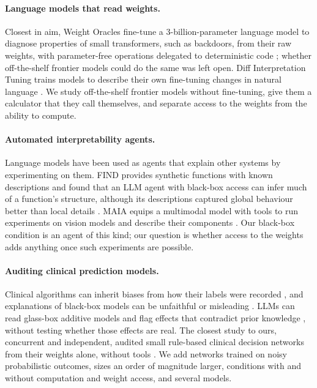 \documentclass[11pt]{article}
\begin{document}
\paragraph{Language models that read weights.} Closest in aim, Weight Oracles fine-tune a 3-billion-parameter language model to diagnose properties of small transformers, such as backdoors, from their raw weights, with parameter-free operations delegated to deterministic code \cite{kabra2026}; whether off-the-shelf frontier models could do the same was left open. Diff Interpretation Tuning trains models to describe their own fine-tuning changes in natural language \cite{goel2025}. We study off-the-shelf frontier models without fine-tuning, give them a calculator that they call themselves, and separate access to the weights from the ability to compute.

\paragraph{Automated interpretability agents.} Language models have been used as agents that explain other systems by experimenting on them. FIND provides synthetic functions with known descriptions and found that an LLM agent with black-box access can infer much of a function's structure, although its descriptions captured global behaviour better than local details \cite{schwettmann2023}. MAIA equips a multimodal model with tools to run experiments on vision models and describe their components \cite{shaham2024}. Our black-box condition is an agent of this kind; our question is whether access to the weights adds anything once such experiments are possible.

\paragraph{Auditing clinical prediction models.} Clinical algorithms can inherit biases from how their labels were recorded \cite{obermeyer2019}, and explanations of black-box models can be unfaithful or misleading \cite{rudin2019,ghassemi2021}. LLMs can read glass-box additive models and flag effects that contradict prior knowledge \cite{lengerich2023,bordt2024}, without testing whether those effects are real. The closest study to ours, concurrent and independent, audited small rule-based clinical decision networks from their weights alone, without tools \cite{nusrat2026}. We add networks trained on noisy probabilistic outcomes, sizes an order of magnitude larger, conditions with and without computation and weight access, and several models.
\end{document}
